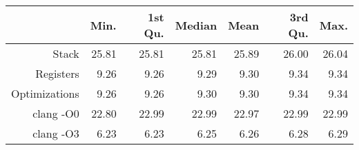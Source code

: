 \begin{table}[ht]
\centering
\begin{tabular}{rrrrrrr}
  \hline
 & Min. & 1st Qu. & Median & Mean & 3rd Qu. & Max. \\ 
  \hline
Stack & 25.81 & 25.81 & 25.81 & 25.89 & 26.00 & 26.04 \\ 
  Registers & 9.26 & 9.26 & 9.29 & 9.30 & 9.34 & 9.34 \\ 
  Optimizations & 9.26 & 9.26 & 9.30 & 9.30 & 9.34 & 9.34 \\ 
  clang -O0 & 22.80 & 22.99 & 22.99 & 22.97 & 22.99 & 22.99 \\ 
  clang -O3 & 6.23 & 6.23 & 6.25 & 6.26 & 6.28 & 6.29 \\ 
   \hline
\end{tabular}
\end{table}
